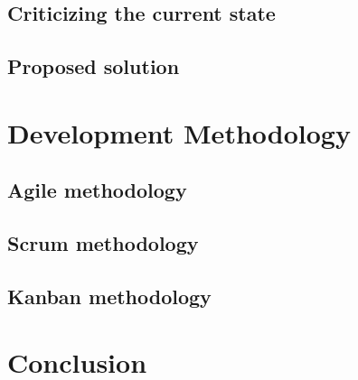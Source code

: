\subsection{Criticizing the current state}

\subsection{Proposed solution}
\lipsum[2][1]

\newpage

\section{Development Methodology}
\subsection{Agile methodology}
\lipsum[2][1]

\subsection{Scrum methodology}
\lipsum[2][1]

\subsection{Kanban methodology}
\lipsum[2][1]

\setcounter{secnumdepth}{0} %
\section{Conclusion}
\lipsum[2][1-3]
